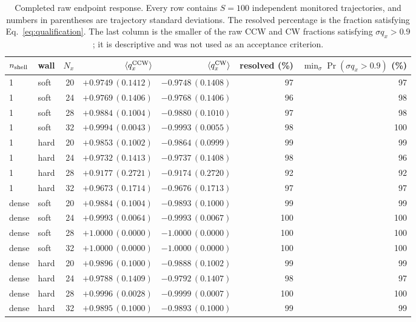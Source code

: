 \documentclass[aps,prb,twocolumn,floatfix,nofootinbib,superscriptaddress]{revtex4-2}
\begin{document}
\begin{table}[t]
\caption{Completed raw endpoint response.  Every row contains $S=100$
independent monitored trajectories, and numbers in parentheses are trajectory
standard deviations.  The resolved percentage is the fraction satisfying
Eq.~\eqref{eq:qualification}.  The last column is the smaller of the raw CCW
and CW fractions satisfying $\sigma q_x>0.9$; it is descriptive and was not
used as an acceptance criterion.}
\label{tab:complete-endpoints}
\begin{ruledtabular}
\begin{tabular}{llrrrrr}
$n_{\rm shell}$ & wall & $N_x$ & $\langle q_x^{\rm CCW}\rangle$ &
$\langle q_x^{\rm CW}\rangle$ & resolved (\%) &
$\min_\sigma\Pr(\sigma q_x>0.9)$ (\%)\\
\hline
1 & soft & 20 & $+0.9749\,(0.1412)$ & $-0.9748\,(0.1408)$ & 97 & 97\\
1 & soft & 24 & $+0.9769\,(0.1406)$ & $-0.9768\,(0.1406)$ & 96 & 98\\
1 & soft & 28 & $+0.9884\,(0.1004)$ & $-0.9880\,(0.1010)$ & 97 & 98\\
1 & soft & 32 & $+0.9994\,(0.0043)$ & $-0.9993\,(0.0055)$ & 98 & 100\\
1 & hard & 20 & $+0.9853\,(0.1002)$ & $-0.9864\,(0.0999)$ & 99 & 99\\
1 & hard & 24 & $+0.9732\,(0.1413)$ & $-0.9737\,(0.1408)$ & 98 & 96\\
1 & hard & 28 & $+0.9177\,(0.2721)$ & $-0.9174\,(0.2720)$ & 92 & 92\\
1 & hard & 32 & $+0.9673\,(0.1714)$ & $-0.9676\,(0.1713)$ & 97 & 97\\
dense & soft & 20 & $+0.9884\,(0.1004)$ & $-0.9893\,(0.1000)$ & 99 & 99\\
dense & soft & 24 & $+0.9993\,(0.0064)$ & $-0.9993\,(0.0067)$ & 100 & 100\\
dense & soft & 28 & $+1.0000\,(0.0000)$ & $-1.0000\,(0.0000)$ & 100 & 100\\
dense & soft & 32 & $+1.0000\,(0.0000)$ & $-1.0000\,(0.0000)$ & 100 & 100\\
dense & hard & 20 & $+0.9896\,(0.1000)$ & $-0.9888\,(0.1002)$ & 99 & 99\\
dense & hard & 24 & $+0.9788\,(0.1409)$ & $-0.9792\,(0.1407)$ & 98 & 97\\
dense & hard & 28 & $+0.9996\,(0.0028)$ & $-0.9999\,(0.0007)$ & 100 & 100\\
dense & hard & 32 & $+0.9895\,(0.1000)$ & $-0.9893\,(0.1000)$ & 99 & 99\\
\end{tabular}
\end{ruledtabular}
\end{table}
\end{document}

